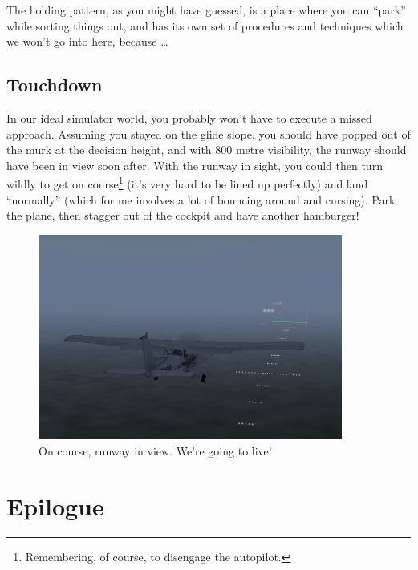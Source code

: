 The holding pattern, as you might have guessed, is a place where you
can ``park'' while sorting things out, and has its own set of
procedures and techniques which we won't go into here, because
\ldots{}

\subsection{Touchdown}

In our ideal simulator world, you probably won't have to execute a
missed approach.  Assuming you stayed on the glide slope,
you should have popped out of the murk at the decision height, and
with 800 metre visibility, the runway should have been in view soon
after.  With the runway in sight, you could then turn wildly to get on
course\footnote{Remembering, of course, to disengage the autopilot.}
(it's very hard to be lined up perfectly) and land ``normally'' (which
for me involves a lot of bouncing around and
cursing).  Park the plane,
then stagger out of the cockpit and have another hamburger!

\begin{figure}
  \begin{center}
    \includegraphics[width=10cm]{img/DH_plane_clipped}
    \caption{On course, runway in view.  We're going to live!}
    \label{fig:DH_plane_clipped}
  \end{center}
\end{figure}


\section{Epilogue}

